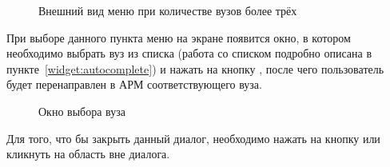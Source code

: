 \begin{figure}[H]
	\caption{Внешний вид меню при количестве вузов более трёх}
	\label{img:university_select:select_university_more_3}
\end{figure}

При выборе данного пункта меню на экране появится окно, в котором необходимо выбрать вуз из списка (работа со списком подробно описана в пункте~\ref{widget:autocomplete}) и нажать на кнопку , после чего пользователь будет перенаправлен в АРМ соответствующего вуза.
\begin{figure}[H]
	\caption{Окно выбора вуза}
	\label{img:university_select:select_university_dialog}
\end{figure}

Для того, что бы закрыть данный диалог, необходимо нажать на кнопку  или кликнуть на область вне диалога.